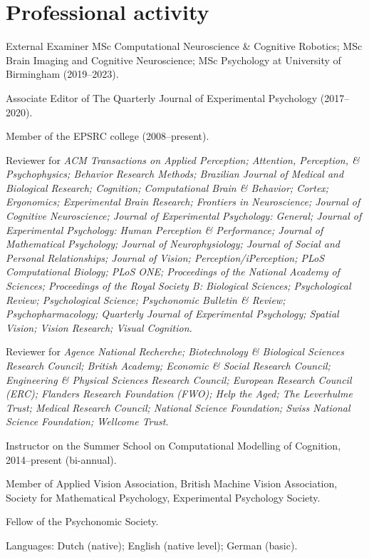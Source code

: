 \documentclass[a4paper, 10pt]{article}
\renewenvironment{itemize}{
  \begin{list}{}{
    \setlength{\leftmargin}{1.5em}
  }
}{
  \end{list}
}
\begin{document}
\section*{Professional activity}
\begin{itemize}
\item External Examiner MSc Computational Neuroscience \& Cognitive Robotics; MSc Brain Imaging and Cognitive Neuroscience; MSc Psychology at University of Birmingham (2019--2023).
\item Associate Editor of The Quarterly Journal of Experimental Psychology (2017--2020).
\item Member of the EPSRC college (2008--present).
\item Reviewer for {\it ACM Transactions on Applied Perception; Attention, Perception, \& Psychophysics; Behavior Research Methods; Brazilian Journal of Medical and Biological Research; Cognition; Computational Brain \& Behavior; Cortex; Ergonomics; Experimental Brain Research; Frontiers in Neuroscience; Journal of Cognitive Neuroscience; Journal of Experimental Psychology: General; Journal of Experimental Psychology: Human Perception \& Performance; Journal of Mathematical Psychology; Journal of Neurophysiology; Journal of Social and Personal Relationships; Journal of Vision; Perception/iPerception; PLoS Computational Biology; PLoS ONE; Proceedings of the National Academy of Sciences; Proceedings of the Royal Society B: Biological Sciences; Psychological Review; Psychological Science; Psychonomic Bulletin \& Review; Psychopharmacology; Quarterly Journal of Experimental Psychology; Spatial Vision; Vision Research; Visual Cognition.}
\item Reviewer for \textit{Agence National Recherche; Biotechnology \& Biological Sciences Research Council; British Academy; Economic \& Social Research Council; Engineering \& Physical Sciences Research Council; European Research Council (ERC); Flanders Research Foundation (FWO); Help the Aged; The Leverhulme Trust; Medical Research Council; National Science Foundation; Swiss National Science Foundation; Wellcome Trust}.
\item Instructor on the Summer School on Computational Modelling of Cognition, 2014--present (bi-annual).
\item Member of Applied Vision Association, British Machine Vision Association, Society for Mathematical Psychology, Experimental Psychology Society.
\item Fellow of the Psychonomic Society.
\item Languages: Dutch (native); English (native level); German (basic).
\end{itemize}
\end{document}
